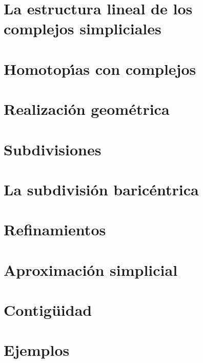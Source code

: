 \documentclass[11pt]{report}
\begin{document}
\section{La estructura lineal de los complejos simpliciales}

%
\section{Homotop\'{\i}as con complejos}

%
\section{Realizaci\'{o}n geom\'{e}trica}

%
\section{Subdivisiones}

%
\section{La subdivisi\'{o}n baric\'{e}ntrica}

%
\section{Refinamientos}

%
\section{Aproximaci\'{o}n simplicial}

%
\section{Contig\"{u}idad}

%
\section{Ejemplos}

%
%


\begin{thebibliography}{9}

\end{thebibliography}
\end{document}
